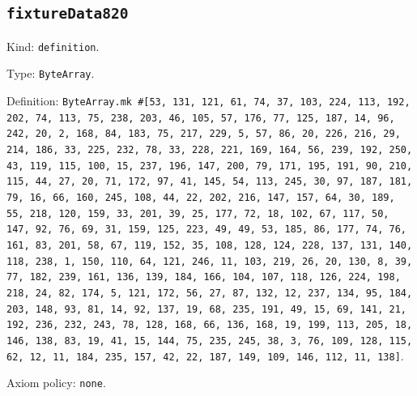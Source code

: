 \documentclass[11pt]{article}
\begin{document}
\subsection*{\texttt{fixtureData820}}
\noindent Kind: \texttt{definition}.\par
\noindent Type: \texttt{ByteArray}.\par
\noindent Definition: \texttt{ByteArray.mk \#[53, 131, 121, 61, 74, 37, 103, 224, 113, 192, 202, 74, 113, 75, 238, 203, 46, 105, 57, 176, 77, 125, 187, 14, 96, 242, 20, 2, 168, 84, 183, 75, 217, 229, 5, 57, 86, 20, 226, 216, 29, 214, 186, 33, 225, 232, 78, 33, 228, 221, 169, 164, 56, 239, 192, 250, 43, 119, 115, 100, 15, 237, 196, 147, 200, 79, 171, 195, 191, 90, 210, 115, 44, 27, 20, 71, 172, 97, 41, 145, 54, 113, 245, 30, 97, 187, 181, 79, 16, 66, 160, 245, 108, 44, 22, 202, 216, 147, 157, 64, 30, 189, 55, 218, 120, 159, 33, 201, 39, 25, 177, 72, 18, 102, 67, 117, 50, 147, 92, 76, 69, 31, 159, 125, 223, 49, 49, 53, 185, 86, 177, 74, 76, 161, 83, 201, 58, 67, 119, 152, 35, 108, 128, 124, 228, 137, 131, 140, 118, 238, 1, 150, 110, 64, 121, 246, 11, 103, 219, 26, 20, 130, 8, 39, 77, 182, 239, 161, 136, 139, 184, 166, 104, 107, 118, 126, 224, 198, 218, 24, 82, 174, 5, 121, 172, 56, 27, 87, 132, 12, 237, 134, 95, 184, 203, 148, 93, 81, 14, 92, 137, 19, 68, 235, 191, 49, 15, 69, 141, 21, 192, 236, 232, 243, 78, 128, 168, 66, 136, 168, 19, 199, 113, 205, 18, 146, 138, 83, 19, 41, 15, 144, 75, 235, 245, 38, 3, 76, 109, 128, 115, 62, 12, 11, 184, 235, 157, 42, 22, 187, 149, 109, 146, 112, 11, 138]}.\par
\noindent Axiom policy: \texttt{none}.\par
\end{document}
